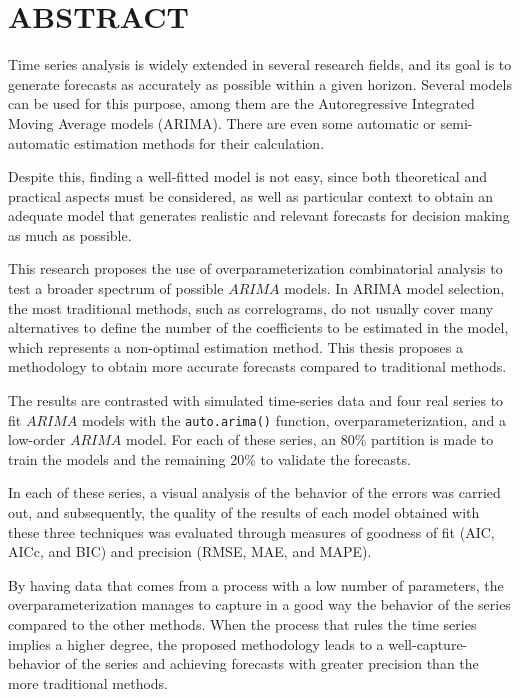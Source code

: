 \documentclass[
]{article}
\begin{document}
\section*{ABSTRACT}

Time series analysis is widely extended in several research fields, and
its goal is to generate forecasts as accurately as possible within a
given horizon. Several models can be used for this purpose, among them
are the Autoregressive Integrated Moving Average models (ARIMA). There
are even some automatic or semi-automatic estimation methods for their
calculation.

Despite this, finding a well-fitted model is not easy, since both
theoretical and practical aspects must be considered, as well as
particular context to obtain an adequate model that generates realistic
and relevant forecasts for decision making as much as possible.

This research proposes the use of overparameterization combinatorial
analysis to test a broader spectrum of possible \(ARIMA\) models. In
ARIMA model selection, the most traditional methods, such as
correlograms, do not usually cover many alternatives to define the
number of the coefficients to be estimated in the model, which
represents a non-optimal estimation method. This thesis proposes a
methodology to obtain more accurate forecasts compared to traditional
methods.

The results are contrasted with simulated time-series data and four real
series to fit \(ARIMA\) models with the \texttt{auto.arima()} function,
overparameterization, and a low-order \(ARIMA\) model. For each of these
series, an 80\% partition is made to train the models and the remaining
20\% to validate the forecasts.

In each of these series, a visual analysis of the behavior of the errors
was carried out, and subsequently, the quality of the results of each
model obtained with these three techniques was evaluated through
measures of goodness of fit (AIC, AICc, and BIC) and precision (RMSE,
MAE, and MAPE).

By having data that comes from a process with a low number of
parameters, the overparameterization manages to capture in a good way
the behavior of the series compared to the other methods. When the
process that rules the time series implies a higher degree, the proposed
methodology leads to a well-capture-behavior of the series and achieving
forecasts with greater precision than the more traditional methods.
\end{document}
